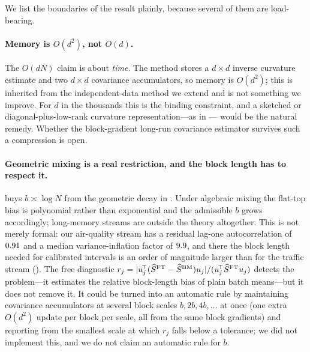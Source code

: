 We list the boundaries of the result plainly, because several of them are load-bearing.

\paragraph{Memory is $O(d^2)$, not $O(d)$.}
The $O(dN)$ claim is about \emph{time}. The method stores a $d\times d$ inverse curvature
estimate and two $d\times d$ covariance accumulators, so memory is $O(d^2)$; this is
inherited from the independent-data method we extend and is not something we improve. For
$d$ in the thousands this is the binding constraint, and a sketched or diagonal-plus-low-rank
curvature representation---as in \citet{kuang2026online,wang2026inference,godichonbaggioni2026complexity}---%
would be the natural remedy. Whether the block-gradient long-run covariance estimator
survives such a compression is open.

\paragraph{Geometric mixing is a real restriction, and the block length has to respect it.}
 buys $b\asymp\log N$ from the geometric decay in
. Under algebraic mixing the flat-top bias is polynomial rather than
exponential and the admissible $b$ grows accordingly; long-memory streams are outside the
theory altogether. This is not merely formal: our air-quality stream has a residual lag-one
autocorrelation of $0.91$ and a median variance-inflation factor of $9.9$, and there the
block length needed for calibrated intervals is an order of magnitude larger than for the
traffic stream (). The free diagnostic
$r_j=|u_j^{\!\top}(\widehat{S}^{\mathrm{FT}}-\widehat{S}^{\mathrm{BM}})u_j|/(u_j^{\!\top}\widehat{S}^{\mathrm{FT}} u_j)$ detects the problem---it estimates
the relative block-length bias of plain batch means---but it does not remove it. It could be
turned into an automatic rule by maintaining covariance accumulators at several block scales
$b,2b,4b,\dots$ at once (one extra $O(d^2)$ update per block per scale, all from the same
block gradients) and reporting from the smallest scale at which $r_j$ falls below a
tolerance; we did not implement this, and we do not claim an automatic rule for $b$.

